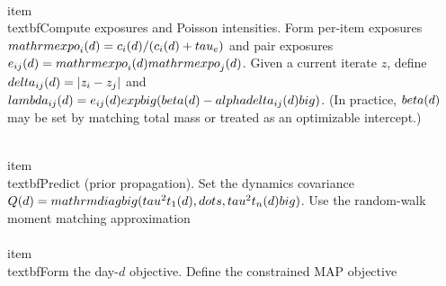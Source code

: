 \documentclass[11pt]{article}
\begin{document}
\\item \\textbf{Compute exposures and Poisson intensities.}
Form per-item exposures $\\mathrm{expo}_i(d)=c_i(d)/(c_i(d)+\\tau_e)$ and pair exposures
$e_{ij}(d)=\\mathrm{expo}_i(d)\\mathrm{expo}_j(d)$.
Given a current iterate $z$, define $\\delta_{ij}(d)=|z_i-z_j|$ and
$\\lambda_{ij}(d)=e_{ij}(d)\\exp\\big(\\beta(d)-\\alpha\\delta_{ij}(d)\\big)$.
(In practice, $\\beta(d)$ may be set by matching total mass or treated as an optimizable intercept.)

\\item \\textbf{Predict (prior propagation).}
Set the dynamics covariance
$Q(d)=\\mathrm{diag}\\big(\\tau^2 t_1(d),\\dots,\\tau^2 t_n(d)\\big)$.
Use the random-walk moment matching approximation
\\[\nm^-(d)=\\widehat z(d-1),\n\\qquad\nP^-(d)=\\Sigma(d-1)+Q(d).\n\\]

\\item \\textbf{Form the day-$d$ objective.}
Define the constrained MAP objective
\\[\n\\mathcal J_d(z)=\\mathcal L_d(z)+\\frac12\\big(z-m^-(d)\\big)^\\top\\big(P^-(d)\\big)^{-1}\\big(z-m^-(d)\\big),\n\\qquad \\text{s.t. }\\mathbf 1^\\top z=0.\n\\]
\end{document}
